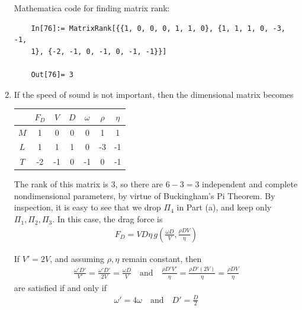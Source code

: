 \documentclass{article}
\theoremstyle{definition}
\newcommand{\f}[2]{\frac{#1}{#2}}
\newcommand{\lp}{\left(}
\newcommand{\rp}{\right)}
\begin{document}
\begin{enumerate}[label=(\alph*)]
	
	Mathematica code for finding matrix rank:
	\begin{lstlisting}
	In[76]:= MatrixRank[{{1, 0, 0, 0, 1, 1, 0}, {1, 1, 1, 0, -3, -1, 
	1}, {-2, -1, 0, -1, 0, -1, -1}}]
	
	Out[76]= 3
	\end{lstlisting}
	
	\item If the speed of sound is not important, then the dimensional matrix becomes
	\begin{center}
		\begin{tabular}{c|c c c c  c c }
			& $F_D$ & $V$ & $D$ & $\omega$ & $\rho$ & $\eta$  \\
			\hline
			$M$ & 1     & 0   & 0   &  0       & 1      &  1      \\
			$L$ & 1     & 1   & 1   &  0       & -3     & -1       \\ 
			$T$ & -2    & -1  & 0   & -1       & 0      & -1    \\  
		\end{tabular} 
	\end{center}

	The rank of this matrix is 3, so there are $6-3 = 3$  independent and complete nondimensional parameters, by virtue of Buckingham's Pi Theorem. By inspection, it is easy to see that we drop $\Pi_4$ in Part (a), and keep only $\Pi_1, \Pi_2,\Pi_3$. In this case, the drag force is 
	\begin{align*}
	\boxed{ F_D = VD\eta\, g\lp \f{ \omega D}{V}, \f{ \rho DV}{\eta} \rp}
	\end{align*}
	
	If $V'=2V$, and assuming $\rho,\eta$ remain constant, then 
	\begin{align*}
	\f{\omega'D'}{V'} = \f{\omega' D'}{2V} = \f{\omega D}{V} \quad \text{and} \quad 
	\f{\rho D' V'}{\eta} = \f{\rho D' (2V) }{\eta} = \f{\rho DV}{\eta} 
	\end{align*}
	are satisfied if and only if 
	\begin{align*}
	\boxed{\omega' = 4\omega \quad\text{and}\quad D' = \f{D}{2}}
	\end{align*}
	
\end{enumerate}
\end{document}
